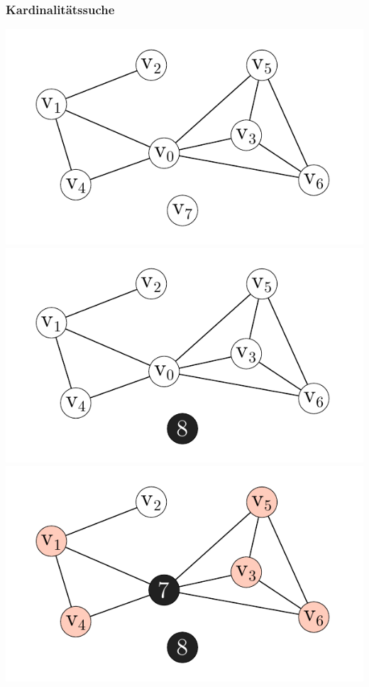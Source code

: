 \documentclass[xcolor=x11names,compress]{beamer}
\begin{document}
\begin{frame}
	\frametitle{Kardinalitätssuche}
	\begin{center}
		\begin{overprint}
			\includegraphics[scale=1.0]{img/execution/mcs/01.pdf}
			\onslide<2>\includegraphics[scale=1.0]{img/execution/mcs/02.pdf}
			\onslide<3>\includegraphics[scale=1.0]{img/execution/mcs/03.pdf}

\end{overprint}
\end{center}
\end{frame}
\end{document}
